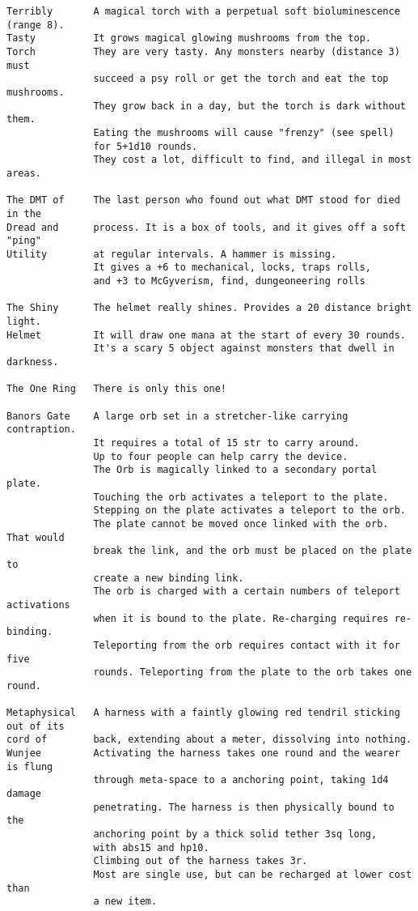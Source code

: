 \begin{verbatim}
Terribly       A magical torch with a perpetual soft bioluminescence (range 8).
Tasty          It grows magical glowing mushrooms from the top.
Torch          They are very tasty. Any monsters nearby (distance 3) must 
               succeed a psy roll or get the torch and eat the top mushrooms.
               They grow back in a day, but the torch is dark without them.
               Eating the mushrooms will cause "frenzy" (see spell)
               for 5+1d10 rounds.
               They cost a lot, difficult to find, and illegal in most areas.

The DMT of     The last person who found out what DMT stood for died in the
Dread and      process. It is a box of tools, and it gives off a soft "ping"
Utility        at regular intervals. A hammer is missing.
               It gives a +6 to mechanical, locks, traps rolls, 
               and +3 to McGyverism, find, dungeoneering rolls

The Shiny      The helmet really shines. Provides a 20 distance bright light.
Helmet         It will draw one mana at the start of every 30 rounds.
               It's a scary 5 object against monsters that dwell in darkness.

The One Ring   There is only this one!

Banors Gate    A large orb set in a stretcher-like carrying contraption.
               It requires a total of 15 str to carry around.
               Up to four people can help carry the device.
               The Orb is magically linked to a secondary portal plate.
               Touching the orb activates a teleport to the plate.
               Stepping on the plate activates a teleport to the orb.
               The plate cannot be moved once linked with the orb. That would
               break the link, and the orb must be placed on the plate to
               create a new binding link.
               The orb is charged with a certain numbers of teleport activations
               when it is bound to the plate. Re-charging requires re-binding.
               Teleporting from the orb requires contact with it for five
               rounds. Teleporting from the plate to the orb takes one round.

Metaphysical   A harness with a faintly glowing red tendril sticking out of its
cord of        back, extending about a meter, dissolving into nothing.
Wunjee         Activating the harness takes one round and the wearer is flung
               through meta-space to a anchoring point, taking 1d4 damage
               penetrating. The harness is then physically bound to the
               anchoring point by a thick solid tether 3sq long,
               with abs15 and hp10.
               Climbing out of the harness takes 3r.
               Most are single use, but can be recharged at lower cost than
               a new item.


\end{verbatim}
